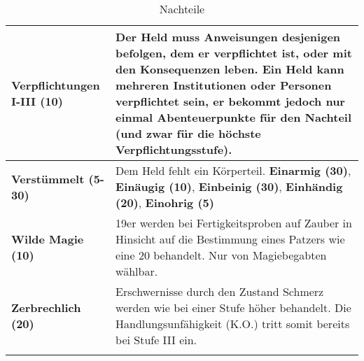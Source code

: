\begin{longtable}{|p{5cm}|p{11cm}|}
\textbf{Verpflichtungen I-III (10)} & Der Held muss Anweisungen desjenigen befolgen, dem er verpflichtet ist, oder mit den Konsequenzen leben. Ein Held kann mehreren Institutionen oder Personen verpflichtet sein, er bekommt jedoch nur einmal Abenteuerpunkte für den Nachteil (und zwar für die höchste Verpflichtungsstufe). \\ \hline

\textbf{Verstümmelt (5-30)} & Dem Held fehlt ein Körperteil. \textbf{Einarmig (30)}, \textbf{Einäugig (10)}, \textbf{Einbeinig (30)}, \textbf{Einhändig (20)}, \textbf{Einohrig (5)} \\ \hline

\textbf{Wilde Magie (10)} & 19er werden bei Fertigkeitsproben auf Zauber in Hinsicht auf die Bestimmung eines Patzers wie eine 20 behandelt. Nur von Magiebegabten wählbar. \\ \hline

\textbf{Zerbrechlich (20)} & Erschwernisse durch den Zustand Schmerz werden wie bei einer Stufe höher behandelt. Die Handlungsunfähigkeit (K.O.) tritt somit bereits bei Stufe III ein. \\ \hline

\caption{Nachteile}
\label{tab:Nachteile}
\end{longtable}